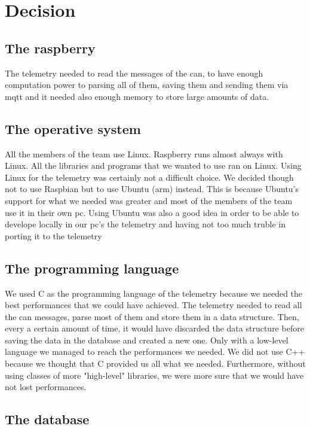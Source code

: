 \section{\huge{Decision}}

\subsection{The raspberry}

The telemetry needed to read the messages of the can, to have enough computation power to parsing all of them,
saving them and sending them via mqtt and it needed also enough memory to store large amounts of data.

\subsection{The operative system}

All the members of the team use Linux. Raspberry runs almost always with Linux. All the libraries and programs that we wanted to
use ran on Linux. Using Linux for the telemetry was certainly not a difficult choice. We decided though not to use Raspbian but
to use Ubuntu (arm) instead. This is because Ubuntu's support for what we needed was greater and most of the members of the team 
use it in their own pc. Using Ubuntu was also a good idea in order to be able to develope locally in our pc's the telemetry and having
not too much truble in porting it to the telemetry

\subsection{The programming language}

We used C as the programming language of the telemetry because we needed the best performances that we could have achieved. The telemetry
needed to read all the can messages, parse most of them and store them in a data structure. Then, every a certain amount of time, it would
have discarded the data structure before saving the data in the database and created a new one. Only with a low-level language we managed to
reach the performances we needed. We did not use C++ because we thought that C provided us all what we needed. Furthermore, without using classes
of more "high-level" libraries, we were more sure that we would have not lost performances.

\subsection{The database}

